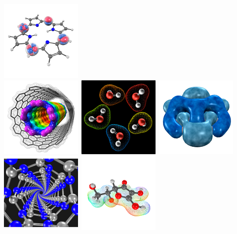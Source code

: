\documentclass[a4paper,12pt]{article}
\begin{document}
\begin{center}
\includegraphics[scale=0.58]{figures/gallery/g21_sm.png} \\
\includegraphics[scale=0.58]{figures/gallery/g10_sm.png}\
\includegraphics[scale=0.58]{figures/gallery/g11_sm.png}\
\includegraphics[scale=0.58]{figures/gallery/g12_sm.png}\
\includegraphics[scale=0.58]{figures/gallery/g17_sm.png}\
\includegraphics[scale=0.58]{figures/gallery/g25_sm.png} \\

\end{center}
\end{document}
